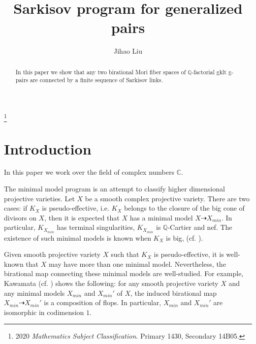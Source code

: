 \documentclass[11pt]{amsart}
\numberwithin{equation}{section}
\renewcommand{\thefootnote}{\fnsymbol{footnote}}
\newcommand{\Qq}{\mathbb{Q}}
\newcommand\blfootnote[1]{%
  \begingroup
  \renewcommand\thefootnote{}\footnote{#1}%
  \addtocounter{footnote}{-1}%
  \endgroup
}
\theoremstyle{definition}
\theoremstyle{remark}
\theoremstyle{definition}
\begin{document}
\title{Sarkisov program for generalized pairs}

\author{Jihao Liu}

\address{Department of Mathematics, The University of Uath, Salt Lake City, UT 84112, USA}



\begin{abstract}
In this paper we show that any two birational Mori fiber spaces of $\Qq$-factorial gklt g-pairs are connected by a finite sequence of Sarkisov links.
\end{abstract}

\blfootnote{2020 \textit{Mathematics Subject Classification}. Primary 1430, Secondary 14B05.}


\maketitle
\pagestyle{myheadings}


\tableofcontents

\section{Introduction}
In this paper we work over the field of complex numbers $\mathbb C$.

The minimal model program is an attempt to classify higher dimensional projective varieties. Let $X$ be a smooth complex projective variety. There are two cases: if $K_X$ is pseudo-effective, i.e. $K_X$ belongs to the closure of the big cone of divisors on $X$, then it is expected that $X$ has a minimal model $X\dashrightarrow X_{min}$. In particular, $K_{X_{min}}$ has terminal singularities, $K_{X_{min}}$ is $\mathbb Q$-Cartier and nef. The existence of such minimal models is known when $K_X$ is big, (cf. \cite{BCHM10}).

Given smooth projective variety $X$ such that $K_X$ is pseudo-effective, it is well-known that $X$ may have more than one minimal model. Nevertheless, the birational map connecting these minimal models are well-studied. For example, Kawamata (cf. \cite{Kaw08}) shows the following: for any smooth projective variety $X$ and any minimal models $X_{min}$ and $X_{min}'$ of $X$, the induced birational map $X_{min}\dashrightarrow X_{min}'$ is a composition of flops. In particular, $X_{min}$ and $X_{min}'$ are isomorphic in codimension $1$.
\end{document}
